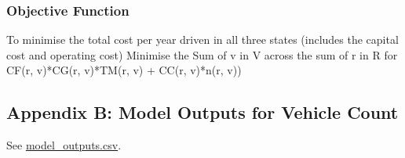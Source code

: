 \documentclass[answers]{exam}
\begin{document}
\subsubsection{Objective Function}
\begin{outline}
\1 To minimise the total cost per year driven in all three states (includes the capital cost and operating cost)
\2 Minimise the Sum of v in V across the sum of r in R for CF(r, v)*CG(r, v)*TM(r, v) + CC(r, v)*n(r, v))



\end{outline}
\newpage
\subsection{Appendix B: Model Outputs for Vehicle Count}
See \href{https://raw.githubusercontent.com/saif1457/iems394/master/model_results.csv}{model\_outputs.csv}.
\end{document}
